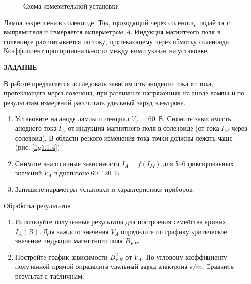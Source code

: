 \begin{figure}
\caption{Схема измерительной установки}
\label{fig3.1.5}
\end{figure}

Лампа закреплена в соленоиде. Ток, проходящий через соленоид, подаётся с выпрямителя и измеряется амперметром $A$.
Индукция магнитного поля в соленоиде рассчитывается по току, протекающему через обмотку соленоида. Коэффициент
пропорциональности между ними указан на установке.

{\Large \bf ЗАДАНИЕ}

В работе предлагается исследовать зависимость анодного тока от тока, протекающего через соленоид, при различных
напряжениях на аноде лампы и по результатам измерений рассчитать удельный заряд электрона.

\begin{enumerate}
\item{ Установите на аноде лампы потенциал $V_A=60$~В. Снимите зависимость анодного тока $I_A$ от индукции магнитного поля в соленоиде (от тока $I_{M}$ через соленоид). В области резкого изменения тока точки должны лежать чаще (рис. \ref{fig3.1.4})}
\item{ Снимите аналогичные зависимости $I_A=f(I_M)$ для 5--6 фиксированных значений $V_A$ в диапазоне 60--120~В.}

\item{ Запишите параметры установки и характеристики приборов.}
\end{enumerate}

{\rm Обработка результатов}
\begin{enumerate}
\item{Используйте полученные результаты для построения семейства кривых $I_{A}(B)$. Для каждого значения $V_A$ определите по графику критическое значение индукции магнитного поля $B_{KP}$}.
\item Постройте  график зависимости $B_{KR}^2$ от $V_A$. По угловому коэффициенту полученной прямой определите удельный заряд электрона $e/m$. Сравните результат с табличным.
\end{enumerate}

